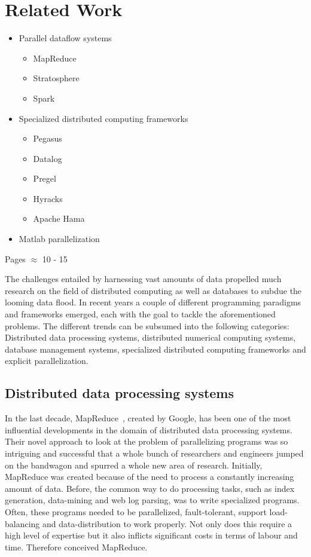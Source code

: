 \chapter{Related Work}
\label{cha:relatedwork}

\begin{itemize}
	\item Parallel dataflow systems
	\begin{itemize}
		\item MapReduce
		\item Stratosphere
		\item Spark
	\end{itemize}
	\item Specialized distributed computing frameworks
	\begin{itemize}
		\item Pegasus
		\item Datalog
		\item Pregel
		\item Hyracks
		\item Apache Hama
	\end{itemize}
	\item Matlab parallelization
\end{itemize}

Pages $\approx$ 10 - 15

The challenges entailed by harnessing vast amounts of data propelled much research on the field of distributed computing as well as databases to subdue the looming data flood.
In recent years a couple of different programming paradigms and frameworks emerged, each with the goal to tackle the aforementioned problems.
The different trends can be subsumed into the following categories: Distributed data processing systems, distributed numerical computing systems, database management systems, specialized distributed computing frameworks and explicit parallelization.

\section{Distributed data processing systems}

In the last decade, MapReduce~\cite{dean:c2008a}, created by Google, has been one of the most influential developments in the domain of distributed data processing systems.
Their novel approach to look at the problem of parallelizing programs was so intriguing and successful that a whole bunch of researchers and engineers jumped on the bandwagon and spurred a whole new area of research.
Initially, MapReduce was created because of the need to process a constantly increasing amount of data.
Before, the common way to do processing tasks, such as index generation, data-mining and web log parsing, was to write specialized programs.
Often, these programs needed to be parallelized, fault-tolerant, support load-balancing and data-distribution to work properly.
Not only does this require a high level of expertise but it also inflicts significant costs in terms of labour and time.
Therefore \citeauthor{dean:c2008a} conceived MapReduce.


